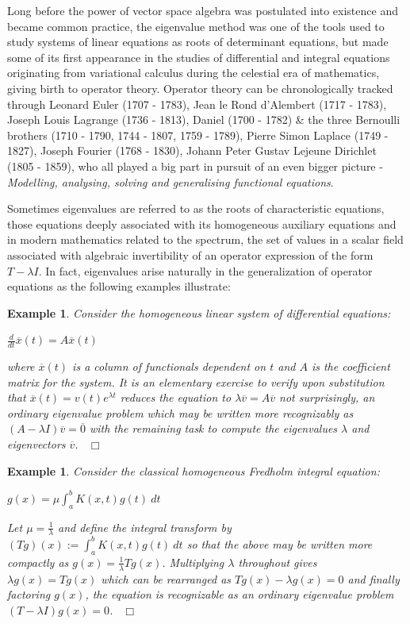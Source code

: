 \documentclass[12pt, oneside]{book}
\newtheorem{example}[theorem]{Example}
\newcommand{\qed}{\hfill ~$\Box$\\}
\begin{document}
\bigskip \noindent Long before the power of vector space algebra was postulated into existence and became common practice, the eigenvalue method was one of the tools used to study systems of linear equations as roots of determinant equations, but made some of its first appearance in the studies of differential and integral equations originating from variational calculus during the celestial era of mathematics, giving birth to operator theory. Operator theory can be chronologically tracked through Leonard Euler (1707 - 1783), Jean le Rond d'Alembert (1717 - 1783), Joseph Louis Lagrange (1736 - 1813), Daniel (1700 - 1782) \& the three Bernoulli brothers (1710 - 1790, 1744 - 1807, 1759 - 1789), Pierre Simon Laplace (1749 - 1827), Joseph Fourier (1768 - 1830), Johann Peter Gustav Lejeune Dirichlet (1805 - 1859), who all played a big part in pursuit of an even bigger picture - \textit{Modelling, analysing, solving and generalising functional equations}.

\bigskip \noindent Sometimes eigenvalues are referred to as the roots of characteristic equations, those equations deeply associated with its homogeneous auxiliary equations and in modern mathematics related to the spectrum, the set of values in a scalar field associated with algebraic invertibility of an operator expression of the form $T - \lambda I$. In fact, eigenvalues arise naturally in the generalization of operator equations as the following examples illustrate:


\begin{example}
\normalfont
\noindent Consider the homogeneous linear system of differential equations: 
\begin{center}
$\frac{d}{dt} \overline{x}(t)=A \overline{x}(t)$
\end{center}
\noindent where $\overline{x}(t)$ is a column of functionals dependent on $t$ and $A$ is the coefficient matrix for the system. It is an elementary exercise to verify upon substitution that 
$\overline{x}(t) = v(t) e^{\lambda t}$ reduces the equation to 
$\lambda \overline{v} = A \overline{v}$ not surprisingly, an ordinary eigenvalue problem which may be written more recognizably as $(A - \lambda I) \overline{v}= \overline{0}$ with the remaining task to compute the eigenvalues $\lambda$ and eigenvectors $\overline{v}$.
\qed
\end{example}

\begin{example}
\normalfont
\noindent Consider the classical homogeneous Fredholm integral equation: 
\begin{center}
$g(x)=\mu \displaystyle \int_a^b K(x,t) g(t) \ dt$
\end{center}
\noindent Let $\mu =\frac{1}{\lambda}$ and define the integral transform by 
$(Tg)(x):=\displaystyle \int^b_a K(x,t) g(t) \ dt$ 
so that the above may be written more compactly as $g(x)=\frac{1}{\lambda} T g(x)$. 
Multiplying $\lambda$ throughout gives $\lambda g(x) = T g(x)$ which can be rearranged as
$T g(x) - \lambda g(x)=0$ and finally factoring $g(x)$, the equation is recognizable as an ordinary eigenvalue problem $(T-\lambda I) g(x) = 0$.
\qed
\end{example}
\end{document}
